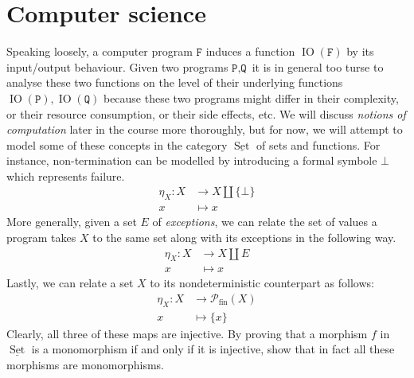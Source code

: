 \documentclass[12pt]{article}
\theoremstyle{plain}
\theoremstyle{definition}
\newcommand{\call}[1]{\mathcal{#1}}
\newcommand{\lto}{\longrightarrow}
\begin{document}
	\section{Computer science}
	Speaking loosely, a computer program $\texttt{F}$ induces a function $\operatorname{IO}(\texttt{F})$ by its input/output behaviour. Given two programs $\texttt{P}, \texttt{Q}$ it is in general too turse to analyse these two functions on the level of their underlying functions $\operatorname{IO}(\texttt{P}), \operatorname{IO}(\texttt{Q})$ because these two programs might differ in their complexity, or their resource consumption, or their side effects, etc. We will discuss \emph{notions of computation} later in the course more thoroughly, but for now, we will attempt to model some of these concepts in the category $\underline{\operatorname{Set}}$ of sets and functions. For instance, non-termination can be modelled by introducing a formal symbole $\bot$ which represents failure.
	\begin{align*}
		\eta_X: X &\lto X \coprod \{ \bot \}\\
		x &\longmapsto x
		\end{align*}
	More generally, given a set $E$ of \emph{exceptions}, we can relate the set of values a program takes $X$ to the same set along with its exceptions in the following way.
	\begin{align*}
		\eta_X: X &\lto X \coprod E\\
		x &\longmapsto x
		\end{align*}
	Lastly, we can relate a set $X$ to its nondeterministic counterpart as follows:
	\begin{align*}
		\eta_X: X &\lto \call{P}_{\text{fin}}(X)\\
		x &\longmapsto \{ x \}
		\end{align*}
	Clearly, all three of these maps are injective. By proving that a morphism $f$ in $\underline{\operatorname{Set}}$ is a monomorphism if and only if it is injective, show that in fact all these morphisms are monomorphisms.
	
	
	
	
	
	
	
	
	
	
	
	
	
	
	
	
\end{document}

